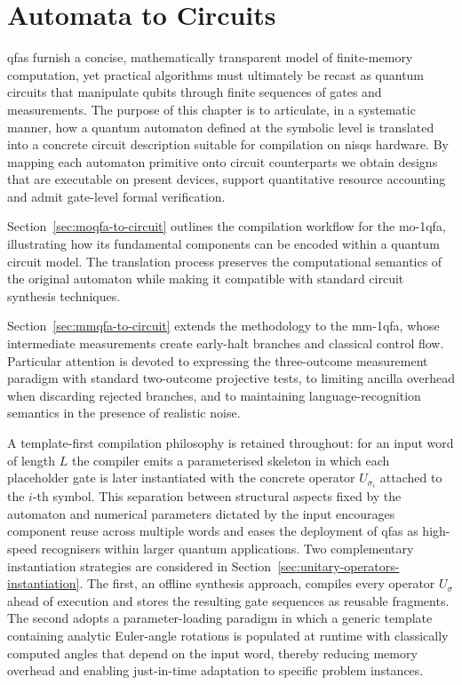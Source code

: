 
\chapter{Automata to Circuits}
\label{chap:automata-to-circuits}
\noindent
\glspl{qfa} furnish a concise, mathematically transparent model of finite-memory computation, yet practical algorithms must ultimately be recast as quantum circuits that manipulate qubits through finite sequences of gates and measurements.  The purpose of this chapter is to articulate, in a systematic manner, how a quantum automaton defined at the symbolic level is translated into a concrete circuit description suitable for compilation on \glspl{nisq} hardware.  By mapping each automaton primitive onto circuit counterparts we obtain designs that are executable on present devices, support quantitative resource accounting and admit gate-level formal verification.

\medskip
\noindent
Section~\ref{sec:moqfa-to-circuit} outlines the compilation workflow for the \gls{mo-1qfa}, illustrating how its fundamental components can be encoded within a quantum circuit model.  The translation process preserves the computational semantics of the original automaton while making it compatible with standard circuit synthesis techniques.

\medskip
\noindent
Section~\ref{sec:mmqfa-to-circuit} extends the methodology to the \gls{mm-1qfa}, whose intermediate measurements create early-halt branches and classical control flow.  Particular attention is devoted to expressing the three-outcome measurement paradigm with standard two-outcome projective tests, to limiting ancilla overhead when discarding rejected branches, and to maintaining language-recognition semantics in the presence of realistic noise.

\medskip
\noindent
A template-first compilation philosophy is retained throughout: for an input word of length $L$ the compiler emits a parameterised skeleton in which each placeholder gate is later instantiated with the concrete operator $U_{\sigma_i}$ attached to the $i$-th symbol.  This separation between structural aspects fixed by the automaton and numerical parameters dictated by the input encourages component reuse across multiple words and eases the deployment of \glspl{qfa} as high-speed recognisers within larger quantum applications.  Two complementary instantiation strategies are considered in Section~\ref{sec:unitary-operators-instantiation}.  The first, an offline synthesis approach, compiles every operator $U_\sigma$ ahead of execution and stores the resulting gate sequences as reusable fragments.  The second adopts a parameter-loading paradigm in which a generic template containing analytic Euler-angle rotations is populated at runtime with classically computed angles that depend on the input word, thereby reducing memory overhead and enabling just-in-time adaptation to specific problem instances.

